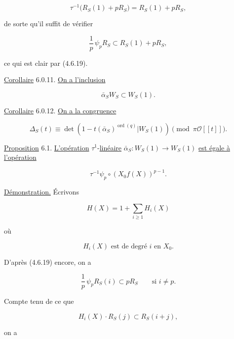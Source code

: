 \begin{equation}\tag{6.0.9}
\tau^{-1}\bigl(R_S(1)+pR_S\bigr)=R_S(1)+pR_S,
\end{equation}

de sorte qu'il suffit de vérifier

\begin{equation}\tag{6.0.10}
\frac1p\,\psi_pR_S\subset R_S(1)+pR_S,
\end{equation}

ce qui est clair par (4.6.19).

\underline{Corollaire} 6.0.11.
\underline{On a l'inclusion}

\[
\bar\alpha_S W_S\subset W_S(1).
\]


\underline{Corollaire} 6.0.12.
\underline{On a la congruence}

\[
\Delta_S(t)\equiv
\det\!\left(
1-t(\bar\alpha_S)^{\operatorname{ord}(q)}
\mathrel{\Big|}W_S(1)\right)
\pmod{\pi\mathcal O[[t]]}.
\]

\underline{Proposition} 6.1.
\underline{L'opération} $\tau^{1}$-\underline{linéaire}
$\bar\alpha_S:W_S(1)\to W_S(1)$ \underline{est égale à l'opération}

\begin{equation}\tag{6.1.1}
\tau^{-1}\psi_p\circ(X_0f(X))^{p-1}.
\end{equation}

\underline{Démonstration.}
Écrivons

\begin{equation}\tag{6.1.2}
H(X)=1+\sum_{i\geq1}H_i(X)
\end{equation}

où

\begin{equation}\tag{6.1.3}
H_i(X)\text{ est de degré $i$ en $X_0$}.
\end{equation}

D'après (4.6.19) encore, on a

\begin{equation}\tag{6.1.4}
\frac1p\,\psi_pR_S(i)\subset pR_S
\qquad\text{si }i\ne p.
\end{equation}

Compte tenu de ce que

\begin{equation}\tag{6.1.5}
H_i(X)\cdot R_S(j)\subset R_S(i+j),
\end{equation}

on a

